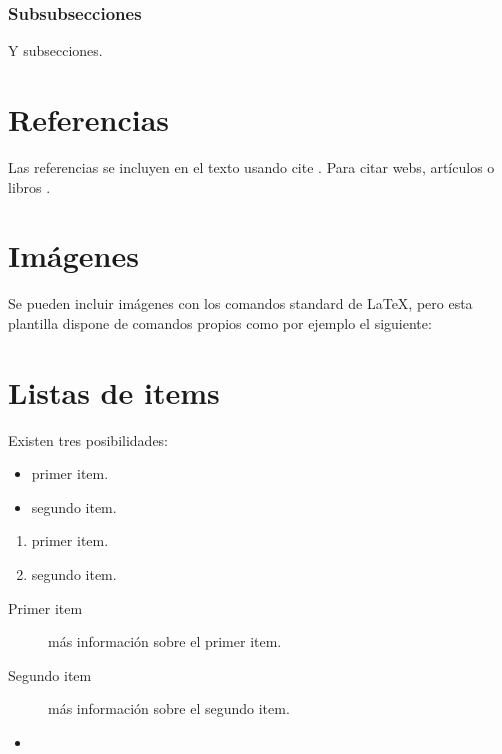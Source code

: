 \subsubsection{Subsubsecciones}

Y subsecciones. 


\section{Referencias}

Las referencias se incluyen en el texto usando cite \cite{wiki:latex}. Para citar webs, artículos o libros \cite{koza92}.


\section{Imágenes}

Se pueden incluir imágenes con los comandos standard de \LaTeX, pero esta plantilla dispone de comandos propios como por ejemplo el siguiente:




\section{Listas de items}

Existen tres posibilidades:

\begin{itemize}
	\item primer item.
	\item segundo item.
\end{itemize}

\begin{enumerate}
	\item primer item.
	\item segundo item.
\end{enumerate}

\begin{description}
	\item[Primer item] más información sobre el primer item.
	\item[Segundo item] más información sobre el segundo item.
\end{description}
	
\begin{itemize}
\item 
\end{itemize}

